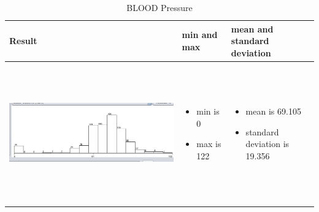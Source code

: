 \documentclass{article}
\begin{document}
\begin{table}[h!]
  \centering
  \begin{tabular}{ | m{5 cm} | m{3cm} | m{3cm} | }
    \hline
   Result &  min and max & mean and standard deviation \\ \hline
    \begin{minipage}{.3\textwidth}
      \includegraphics[width=\linewidth, height=60mm]{blood pressure.png}
    \end{minipage}
    &
      \begin{itemize}
        \item  min is 0
        \item max is 122
          
      \end{itemize}
    & 
      \begin{itemize}
        \item  mean is 69.105
        \item  standard deviation is 19.356  
          
      \end{itemize}
    \\ \hline
  \end{tabular}
  \caption{ BLOOD Pressure}\label{tbl:myLboro}
\end{table}
\end{document}
